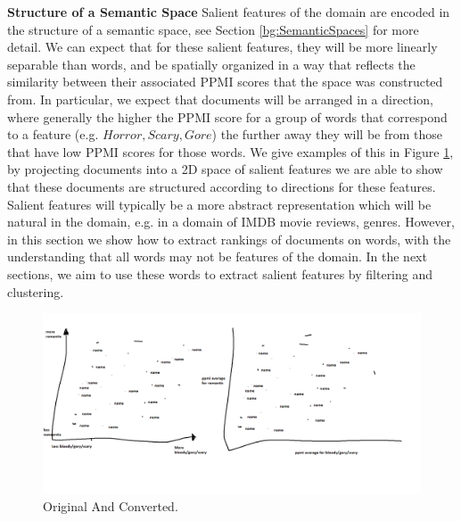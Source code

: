\noindent \textbf{Structure of a Semantic Space} Salient features of the domain are encoded in the structure of a semantic space, see Section \ref{bg:SemanticSpaces} for more detail. We can expect that for these salient features, they will be more linearly separable than words, and be spatially organized in a way that reflects the similarity between their associated PPMI scores that the space was constructed from. In particular, we expect that documents will be arranged in a direction, where generally the higher the PPMI score for a group of words that correspond to a feature (e.g. $Horror, Scary, Gore$) the further away they will be from those that have low PPMI scores for those words. We give examples of this in Figure \ref{ch3:DirectionsGraphic}, by projecting documents into a 2D space of salient features we are able to show that these documents are structured according to directions for these features. Salient features will typically be a more abstract representation which will be natural in the domain, e.g. in a domain of IMDB movie reviews, genres. However, in this section we show how to extract rankings of documents on words, with the understanding that all words may not be features of the domain. In the next sections, we aim to use these words to extract salient features by filtering and clustering.

\begin{figure}[t]
	\includegraphics[width=\textwidth]{images/DirectionsGraphic.png}
	\centering
	\caption{Original And Converted.}\label{ch3:DirectionsGraphic}
\end{figure}


